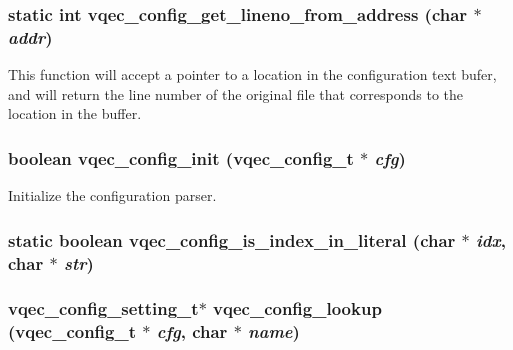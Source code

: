 \subsubsection{\setlength{\rightskip}{0pt plus 5cm}static int vqec\_\-config\_\-get\_\-lineno\_\-from\_\-address (char $\ast$ {\em addr})\hspace{0.3cm}{\tt  [static]}}\label{vqec__config__parser_8c_d7090270a7b67e1b812884043935ccfc}


This function will accept a pointer to a location in the configuration text bufer, and will return the line number of the original file that corresponds to the location in the buffer. 
\subsubsection{\setlength{\rightskip}{0pt plus 5cm}boolean vqec\_\-config\_\-init (\bf{vqec\_\-config\_\-t} $\ast$ {\em cfg})}\label{vqec__config__parser_8c_ead34c321a08f14454b9c0b3faa1d94f}


Initialize the configuration parser. 
\subsubsection{\setlength{\rightskip}{0pt plus 5cm}static boolean vqec\_\-config\_\-is\_\-index\_\-in\_\-literal (char $\ast$ {\em idx}, char $\ast$ {\em str})\hspace{0.3cm}{\tt  [static]}}\label{vqec__config__parser_8c_7e85a1c24834afafb3cd500e3321cbfa}


\subsubsection{\setlength{\rightskip}{0pt plus 5cm}\bf{vqec\_\-config\_\-setting\_\-t}$\ast$ vqec\_\-config\_\-lookup (\bf{vqec\_\-config\_\-t} $\ast$ {\em cfg}, char $\ast$ {\em name})}\label{vqec__config__parser_8c_c5fb9837424d9e9dd06cc152476a80de}


